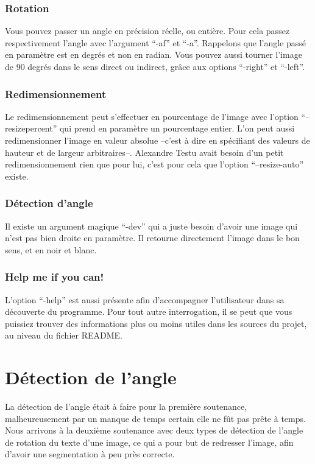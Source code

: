 \documentclass[a4paper,12pt]{report}
\begin{document}
\subsection{ Rotation }
 Vous pouvez passer un angle en pr\'ecision r\'eelle, ou enti\`ere. Pour
 cela passez respectivement l'angle avec l'argument ``-af'' et ``-a''.
 Rappelons que l'angle pass\'e en param\`etre est en degr\'es et non en
 radian. Vous pouvez aussi tourner l'image de 90 degr\'es dans le sens
 direct ou indirect, gr\^ace aux options ``-right'' et ``-left''.
\subsection{ Redimensionnement }
 Le redimensionnement peut s'effectuer en pourcentage de l'image avec
 l'option ``--resizepercent'' qui prend en param\`etre un pourcentage
 entier. L'on peut aussi redimensionner l'image en valeur absolue
 --c'est \`a dire en sp\'ecifiant des valeurs de hauteur et de largeur
 arbitraires--. Alexandre Testu avait besoin d'un petit redimensionnement
 rien que pour lui, c'est pour cela que l'option ``--resize-auto''
 existe.
\subsection{ D\'etection d'angle}
 Il existe un argument magique ``-dev'' qui a juste besoin d'avoir une
 image qui n'est pas bien droite en param\`etre. Il retourne directement
 l'image dans le bon sens, et en noir et blanc.
\subsection{ Help me if you can! }
 L'option ``-help'' est aussi pr\'esente afin d'accompagner
 l'utilisateur dans sa d\'ecouverte du programme. Pour tout autre
 interrogation, il se peut que vous puissiez trouver des informations
 plus ou moins utiles dans les sources du projet, au niveau du fichier
 README.


\chapter{D\'etection de l'angle }
 La d\'etection de l'angle \'etait \`a faire pour la premi\`ere
 soutenance, malheureusement par un manque de temps certain elle ne f\^ut
 pas pr\^ete \`a temps. Nous arrivons \`a la deuxi\`eme soutenance avec
 deux types de d\'etection de l'angle de rotation du texte d'une image,
 ce qui a pour but de redresser l'image, afin d'avoir une segmentation
 \`a peu pr\`es correcte.
\end{document}
